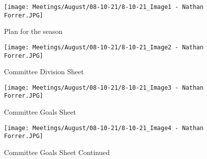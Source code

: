 \begin{figure}[htp]
\centering
\texttt{[image: Meetings/August/08-10-21/8-10-21\_Image1 - Nathan Forrer.JPG]}
\caption{Plan for the season}
\label{fig:pic1}
\end{figure}

\begin{figure}[ht]
\centering
\begin{minipage}[b]{.50\textwidth}
	\centering
	\texttt{[image: Meetings/August/08-10-21/8-10-21\_Image2 - Nathan Forrer.JPG]}
	\caption{Committee Division Sheet}
	\label{fig:pic2}
\end{minipage}%
\hfill%
\begin{minipage}[b]{.50\textwidth}
	\centering
	\texttt{[image: Meetings/August/08-10-21/8-10-21\_Image3 - Nathan Forrer.JPG]}
	\caption{Committee Goals Sheet}
	\label{fig:pic3}
\end{minipage}
\end{figure}

\begin{figure}[htp]
\centering
\texttt{[image: Meetings/August/08-10-21/8-10-21\_Image4 - Nathan Forrer.JPG]}
\caption{Committee Goals Sheet Continued}
\label{fig:pic4}
\end{figure}